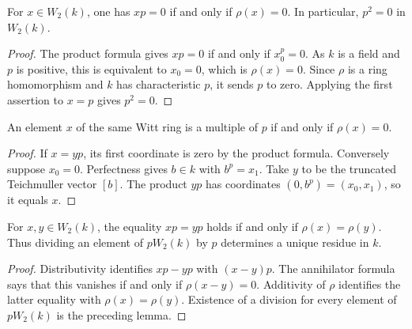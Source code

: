 \begin{lemma}
\label{lem:witt-two-prime-annihilator}
\leanok
{}
For $x\in W_2(k)$, one has $xp=0$ if and only if
$\rho(x)=0$. In particular, $p^2=0$ in $W_2(k)$.
\end{lemma}
\begin{proof}
The product formula gives $xp=0$ if and only if
$x_0^p=0$. As $k$ is a field and $p$ is positive,
this is equivalent to $x_0=0$, which is
$\rho(x)=0$. Since $\rho$ is a ring homomorphism
and $k$ has characteristic $p$, it sends $p$ to
zero. Applying the first assertion to $x=p$
gives $p^2=0$.
\end{proof}

\begin{lemma}
\label{lem:witt-two-prime-kernel}
\leanok
{}
An element $x$ of the same Witt ring is a multiple
of $p$ if and only if $\rho(x)=0$.
\end{lemma}
\begin{proof}
If $x=yp$, its first coordinate is zero by the
product formula. Conversely suppose $x_0=0$.
Perfectness gives $b\in k$ with $b^p=x_1$.
Take $y$ to be the truncated Teichmuller vector
$[b]$. The product $yp$ has coordinates
$(0,b^p)=(x_0,x_1)$, so it equals $x$.
\end{proof}

\begin{lemma}
\label{lem:witt-two-divided-prime-uniqueness}
\leanok
{}
For $x,y\in W_2(k)$, the equality $xp=yp$ holds
if and only if $\rho(x)=\rho(y)$. Thus dividing
an element of $pW_2(k)$ by $p$ determines a unique
residue in $k$.
\end{lemma}
\begin{proof}
Distributivity identifies $xp-yp$ with $(x-y)p$.
The annihilator formula says that this vanishes
if and only if $\rho(x-y)=0$. Additivity of
$\rho$ identifies the latter equality with
$\rho(x)=\rho(y)$. Existence of a division for
every element of $pW_2(k)$ is the preceding lemma.
\end{proof}
